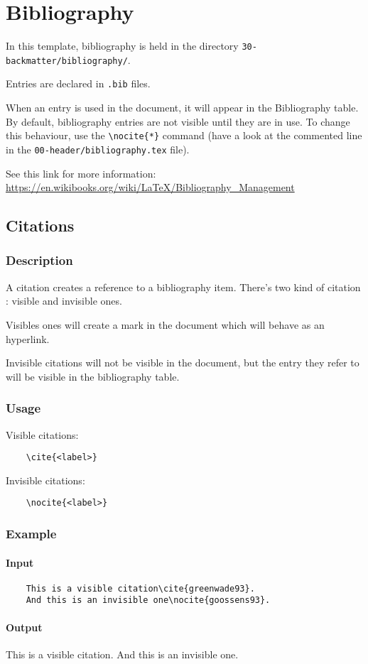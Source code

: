 \chapter{Bibliography}

In this template, bibliography is held in the directory \texttt{30-backmatter/bibliography/}.

Entries are declared in \texttt{.bib} files.

When an entry is used in the document, it will appear in the Bibliography table.
By default, bibliography entries are not visible until they are in use. To
change this behaviour, use the \verb|\nocite{*}| command (have a look at the
commented line in the \texttt{00-header/bibliography.tex} file).


See this link for more information: \url{https://en.wikibooks.org/wiki/LaTeX/Bibliography_Management}


\section{Citations}

\subsection{Description}

A citation creates a reference to a bibliography item. There's two kind of
citation : visible and invisible ones.

Visibles ones will create a mark in the document which will behave as an
hyperlink.

Invisible citations will not be visible in the document, but the entry they
refer to will be visible in the bibliography table.


\subsection{Usage}

Visible citations:
\begin{lstlisting}
    \cite{<label>}
\end{lstlisting}


Invisible citations:
\begin{lstlisting}
    \nocite{<label>}
\end{lstlisting}


\subsection{Example}
\subsubsection{Input}

\begin{lstlisting}
    This is a visible citation\cite{greenwade93}.
    And this is an invisible one\nocite{goossens93}.
\end{lstlisting}


\subsubsection{Output}
This is a visible citation\cite{greenwade93}.
And this is an invisible one\nocite{goossens93}.
